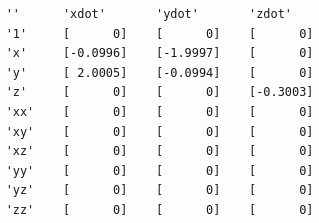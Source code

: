 \documentclass[onecolumn,11pt]{article}
\begin{document}
    
    

\begin{table}[where!]
\caption{\small Three-dimensional linear system.}\label{Tab:Ex1_3d}
\begin{center}
{\footnotesize
\begin{verbatim}
    ''      'xdot'       'ydot'       'zdot'   
    '1'     [      0]    [      0]    [      0]
    'x'     [-0.0996]    [-1.9997]    [      0]
    'y'     [ 2.0005]    [-0.0994]    [      0]
    'z'     [      0]    [      0]    [-0.3003]
    'xx'    [      0]    [      0]    [      0]
    'xy'    [      0]    [      0]    [      0]
    'xz'    [      0]    [      0]    [      0]
    'yy'    [      0]    [      0]    [      0]
    'yz'    [      0]    [      0]    [      0]
    'zz'    [      0]    [      0]    [      0]
    \end{verbatim}
    }
    \end{center}
    \end{table}
\end{document}
